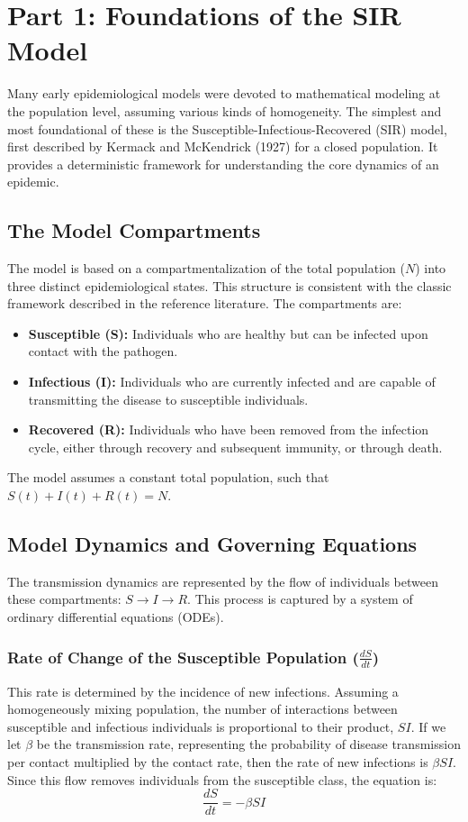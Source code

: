 \documentclass[12pt, a4paper]{article}
\begin{document}
\section{Part 1: Foundations of the SIR Model}
Many early epidemiological models were devoted to mathematical modeling at the population level, assuming various kinds of homogeneity. The simplest and most foundational of these is the Susceptible-Infectious-Recovered (SIR) model, first described by Kermack and McKendrick (1927) for a closed population. It provides a deterministic framework for understanding the core dynamics of an epidemic.

\subsection{The Model Compartments}
The model is based on a compartmentalization of the total population ($N$) into three distinct epidemiological states. This structure is consistent with the classic framework described in the reference literature. The compartments are:

\begin{itemize}
    \item \textbf{Susceptible (S):} Individuals who are healthy but can be infected upon contact with the pathogen.
    \item \textbf{Infectious (I):} Individuals who are currently infected and are capable of transmitting the disease to susceptible individuals.
    \item \textbf{Recovered (R):} Individuals who have been removed from the infection cycle, either through recovery and subsequent immunity, or through death.
\end{itemize}

The model assumes a constant total population, such that $S(t) + I(t) + R(t) = N$.

\subsection{Model Dynamics and Governing Equations}
The transmission dynamics are represented by the flow of individuals between these compartments: $S \to I \to R$. This process is captured by a system of ordinary differential equations (ODEs).

\subsubsection{Rate of Change of the Susceptible Population ($\frac{dS}{dt}$)}
This rate is determined by the incidence of new infections. Assuming a homogeneously mixing population, the number of interactions between susceptible and infectious individuals is proportional to their product, $SI$. If we let $\beta$ be the transmission rate, representing the probability of disease transmission per contact multiplied by the contact rate, then the rate of new infections is $\beta SI$. Since this flow removes individuals from the susceptible class, the equation is:
\begin{equation} \label{eq:dSdt}
\frac{dS}{dt} = -\beta SI
\end{equation}
\end{document}
